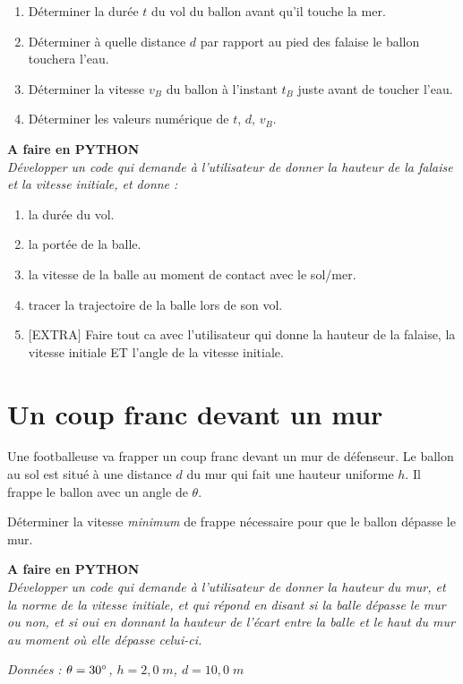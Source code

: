 \documentclass[11pt,a4paper]{article}
\newenvironment{python}
 {\begin{shaded} \textbf{A faire en PYTHON}\\ \itshape } { \end{shaded}}
\begin{document}
\begin{enumerate}
    \item Déterminer la durée $t$ du vol du ballon avant qu'il touche la mer. 
    \item Déterminer à quelle distance $d$ par rapport au pied des falaise le ballon touchera l'eau. 
    \item Déterminer la vitesse $v_B$ du ballon à l'instant $t_B$ juste avant de toucher l'eau.
    \item Déterminer les valeurs numérique de $t$, $d$, $v_B$. 
\end{enumerate}

\begin{python}
Développer un code qui demande à l'utilisateur de donner la hauteur de la falaise et la vitesse initiale, et donne : 
\begin{enumerate}
    \item la durée du vol.
    \item la portée de la balle. 
    \item la vitesse de la balle au moment de contact avec le sol/mer. 
    \item tracer la trajectoire de la balle lors de son vol. 
    \item $[$EXTRA$]$ Faire tout ca avec l'utilisateur qui donne la hauteur de la falaise, la vitesse initiale ET l'angle de la vitesse initiale. 
\end{enumerate}
\end{python}

\section{Un coup franc devant un mur}
Une footballeuse va frapper un coup franc devant un mur de défenseur. Le ballon au sol est situé à une distance $d$ du mur qui fait une hauteur uniforme $h$. Il frappe le ballon avec un angle de $\theta$. 

Déterminer la vitesse \textit{minimum} de frappe nécessaire pour que le ballon dépasse le mur. 

\begin{python}
Développer un code qui demande à l'utilisateur de donner la hauteur du mur, et la norme de la vitesse initiale, et qui répond en disant si la balle dépasse le mur ou non, et si oui en donnant la hauteur de l'écart entre la balle et le haut du mur au moment où elle dépasse celui-ci. 
\end{python}

\textit{Données : $\theta=30\degree$, $h=2,0\; m$, $d=10,0\; m$}
\end{document}
